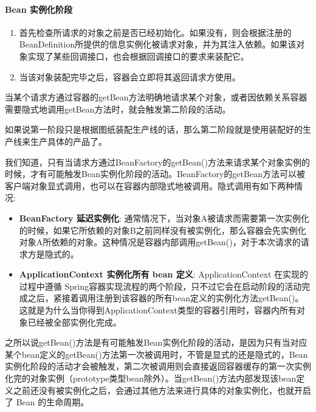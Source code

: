 \paragraph*{Bean 实例化阶段}

\begin{enumerate}
    \item 首先检查所请求的对象之前是否已经初始化。如果没有，则会根据注册的BeanDefinition所提供的信息实例化被请求对象，并为其注入依赖。如果该对象实现了某些回调接口，也会根据回调接口的要求来装配它。
    \item 当该对象装配完毕之后，容器会立即将其返回请求方使用。
\end{enumerate}

当某个请求方通过容器的getBean方法明确地请求某个对象，或者因依赖关系容器需要隐式地调用getBean方法时，就会触发第二阶段的活动。

如果说第一阶段只是根据图纸装配生产线的话，那么第二阶段就是使用装配好的生产线来生产具体的产品了。

我们知道，只有当请求方通过BeanFactory的getBean()方法来请求某个对象实例的时候，才有可能触发Bean实例化阶段的活动。BeanFactory的getBean方法可以被客户端对象显式调用，也可以在容器内部隐式地被调用。隐式调用有如下两种情况:

\begin{itemize}
    \item \textbf{BeanFactory 延迟实例化}: 通常情况下，当对象A被请求而需要第一次实例化的时候，如果它所依赖的对象B之前同样没有被实例化，那么容器会先实例化对象A所依赖的对象。这种情况是容器内部调用getBean()，对于本次请求的请求方是隐式的。
    \item \textbf{ApplicationContext 实例化所有 bean 定义}: ApplicationContext 在实现的过程中遵循 Spring容器实现流程的两个阶段，只不过它会在启动阶段的活动完成之后，紧接着调用注册到该容器的所有bean定义的实例化方法getBean()。这就是为什么当你得到ApplicationContext类型的容器引用时，容器内所有对象已经被全部实例化完成。
\end{itemize}

之所以说getBean()方法是有可能触发Bean实例化阶段的活动，是因为只有当对应某个bean定义的getBean()方法第一次被调用时，不管是显式的还是隐式的，Bean实例化阶段的活动才会被触发，第二次被调用则会直接返回容器缓存的第一次实例化完的对象实例（prototype类型bean除外）。当getBean()方法内部发现该bean定义之前还没有被实例化之后，会通过其他方法来进行具体的对象实例化，也就开启了 Bean 的生命周期。

